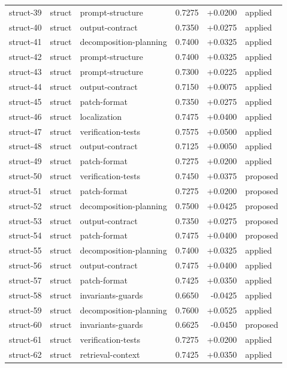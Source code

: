 \begin{center}
\begin{longtable}{llp{5.2cm}rrl}
struct-39 & struct & prompt-structure & 0.7275 & +0.0200 & applied \\
struct-40 & struct & output-contract & 0.7350 & +0.0275 & applied \\
struct-41 & struct & decomposition-planning & 0.7400 & +0.0325 & applied \\
struct-42 & struct & prompt-structure & 0.7400 & +0.0325 & applied \\
struct-43 & struct & prompt-structure & 0.7300 & +0.0225 & applied \\
struct-44 & struct & output-contract & 0.7150 & +0.0075 & applied \\
struct-45 & struct & patch-format & 0.7350 & +0.0275 & applied \\
struct-46 & struct & localization & 0.7475 & +0.0400 & applied \\
struct-47 & struct & verification-tests & 0.7575 & +0.0500 & applied \\
struct-48 & struct & output-contract & 0.7125 & +0.0050 & applied \\
struct-49 & struct & patch-format & 0.7275 & +0.0200 & applied \\
struct-50 & struct & verification-tests & 0.7450 & +0.0375 & proposed \\
struct-51 & struct & patch-format & 0.7275 & +0.0200 & proposed \\
struct-52 & struct & decomposition-planning & 0.7500 & +0.0425 & proposed \\
struct-53 & struct & output-contract & 0.7350 & +0.0275 & proposed \\
struct-54 & struct & patch-format & 0.7475 & +0.0400 & proposed \\
struct-55 & struct & decomposition-planning & 0.7400 & +0.0325 & applied \\
struct-56 & struct & output-contract & 0.7475 & +0.0400 & applied \\
struct-57 & struct & patch-format & 0.7425 & +0.0350 & applied \\
struct-58 & struct & invariants-guards & 0.6650 & -0.0425 & applied \\
struct-59 & struct & decomposition-planning & 0.7600 & +0.0525 & applied \\
struct-60 & struct & invariants-guards & 0.6625 & -0.0450 & proposed \\
struct-61 & struct & verification-tests & 0.7275 & +0.0200 & applied \\
struct-62 & struct & retrieval-context & 0.7425 & +0.0350 & applied \\

\end{longtable}
\end{center}
